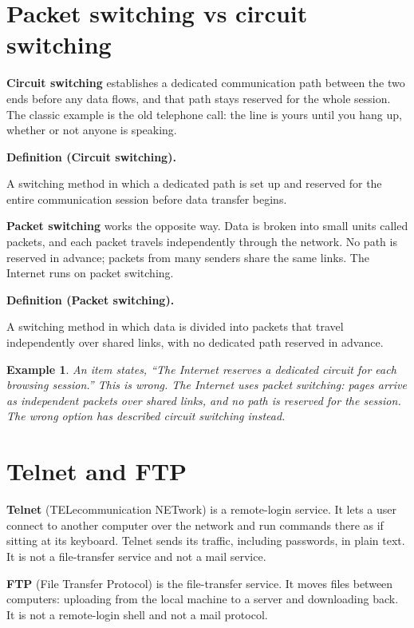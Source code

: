 \documentclass[11pt]{article}
\newtheorem{example}{Example}[section]
\newenvironment{definitionbox}[1]{%
  \par\noindent\textbf{Definition (#1).}\ \itshape
}{\par\vspace{0.3em}}
\begin{document}
\section{Packet switching vs circuit switching}
\textbf{Circuit switching} establishes a dedicated communication path between
the two ends before any data flows, and that path stays reserved for the whole
session. The classic example is the old telephone call: the line is yours
until you hang up, whether or not anyone is speaking.

\begin{definitionbox}{Circuit switching}
A switching method in which a dedicated path is set up and reserved for the
entire communication session before data transfer begins.
\end{definitionbox}

\textbf{Packet switching} works the opposite way. Data is broken into small
units called packets, and each packet travels independently through the
network. No path is reserved in advance; packets from many senders share the
same links. The Internet runs on packet switching.

\begin{definitionbox}{Packet switching}
A switching method in which data is divided into packets that travel
independently over shared links, with no dedicated path reserved in advance.
\end{definitionbox}

\begin{example}
An item states, ``The Internet reserves a dedicated circuit for each browsing
session.'' This is wrong. The Internet uses packet switching: pages arrive as
independent packets over shared links, and no path is reserved for the session.
The wrong option has described circuit switching instead.
\end{example}

\section{Telnet and FTP}
\textbf{Telnet} (TELecommunication NETwork) is a remote-login service. It lets
a user connect to another computer over the network and run commands there as
if sitting at its keyboard. Telnet sends its traffic, including passwords, in
plain text. It is not a file-transfer service and not a mail service.

\textbf{FTP} (File Transfer Protocol) is the file-transfer service. It moves
files between computers: uploading from the local machine to a server and
downloading back. It is not a remote-login shell and not a mail protocol.
\end{document}
